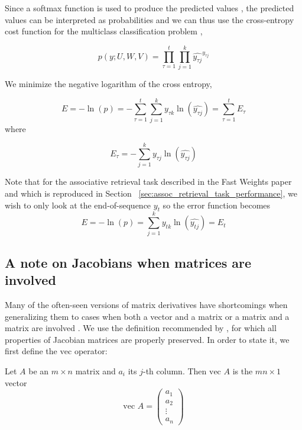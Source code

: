 Since a softmax function is used to produce the predicted values \cite[p. 5]{DBLP:conf/nips/BaHMLI16}, the predicted values can be interpreted as probabilities and we can thus use the cross-entropy cost function for the multiclass classification problem \cite{bishop2006pattern},

\begin{equation*}
p(y; U, W, V) = \prod_{\tau=1}^{t}\prod_{j=1}^{k}\widehat{y_{\tau j}}^{y_{\tau j}}
\end{equation*}

We minimize the negative logarithm of the cross entropy,

\begin{equation*}
  E = -\ln(p) = -\sum_{\tau=1}^t \sum_{j=1}^k y_{\tau k} \ln\left(\widehat{y_{\tau j}}\right) = \sum_{\tau=1}^{t} E_\tau
\end{equation*}
%
where

\begin{equation*}
  E_\tau = -\sum_{j=1}^{k} y_{\tau j} \ln \left(\widehat{y_{\tau j}}\right)
\end{equation*}

Note that for the associative retrieval task described in the Fast Weights paper and which is reproduced in Section ~\ref{sec:assoc_retrieval_task_performance}, we wish to only look at the end-of-sequence $y_t$ so the error function becomes
\begin{equation*}
  E = -\ln(p) = \sum_{j=1}^k y_{t k} \ln\left(\widehat{y_{t j}}\right) = E_t
\end{equation*}

\subsection{A note on Jacobians when matrices are involved}

Many of the often-seen versions of matrix derivatives have shortcomings when generalizing them to cases when both a vector and a matrix or a matrix and a matrix are involved \cite[p. 193-197]{magnus2007matrix}. We use the definition recommended by \citet{magnus2007matrix}, for which all properties of Jacobian matrices are properly preserved. In order to state it, we first define the $\mbox{vec}$ operator:

\begin{definition}
  Let $A$ be an $m \times n$ matrix and $a_i$ its $j$-th column. Then $\mbox{vec } A$ is the $mn \times 1$ vector
  \begin{equation*}
    \mbox{vec } A = \begin{pmatrix}
      a_1 \\ a_2 \\ \vdots \\ a_n
      \end{pmatrix}
  \end{equation*}
  \cite[p. 34]{magnus2007matrix}
\end{definition}

